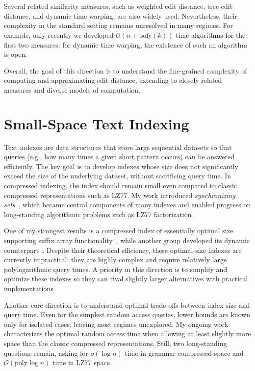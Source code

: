 \documentclass[a4paper,11pt]{article}
\newcommand{\Oh}{\mathcal{O}}
\newcommand{\Ohtilde}{\tilde{\mathcal{O}}}
\begin{document}
Several related similarity measures, such as weighted edit distance, tree edit distance, and dynamic time warping, are also widely used. 
Nevertheless, their complexity in the standard setting remains unresolved in many regimes. 
For example, only recently we developed $\Ohtilde(n+\mathrm{poly}(k))$-time algorithms for the first two measures; for dynamic time warping, the existence of such an algorithm is open.  

Overall, the goal of this direction is to understand the fine-grained complexity of computing and approximating edit distance, extending to closely related measures and diverse models of computation.

\section{Small-Space Text Indexing}

Text indexes are data structures that store large sequential datasets so that queries (e.g., how many times a given short pattern occurs) can be answered efficiently. 
The key goal is to develop indexes whose size does not significantly exceed the size of the underlying dataset, without sacrificing query time. 
In compressed indexing, the index should remain small even compared to classic compressed representations such as LZ77.  
My work introduced \emph{synchronizing sets}~\cite{KK19}, which became central components of many indexes and enabled progress on long-standing algorithmic problems such as LZ77 factorization~\cite{KK24}.  

One of my strongest results is a compressed index of essentially optimal size supporting suffix array functionality~\cite{KK23}, while another group developed its dynamic counterpart~\cite{NT24}.  
Despite their theoretical efficiency, these optimal-size indexes are currently impractical: they are highly complex and require relatively large polylogarithmic query times. 
A priority in this direction is to simplify and optimize these indexes so they can rival slightly larger alternatives with practical implementations.  

Another core direction is to understand optimal trade-offs between index size and query time. 
Even for the simplest random access queries, lower bounds are known only for isolated cases, leaving most regimes unexplored. 
My ongoing work characterizes the optimal random access time when allowing at least slightly more space than the classic compressed representations. Still, two long-standing questions remain, asking for $o(\log n)$ time in grammar-compressed space and $\Oh(\mathrm{poly}\log n)$ time in LZ77 space.  
\end{document}

